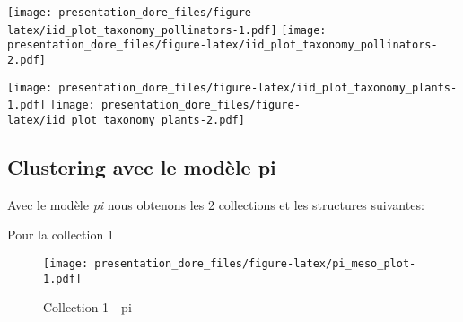\documentclass[
]{article}
\begin{document}
\texttt{[image: presentation\_dore\_files/figure-latex/iid\_plot\_taxonomy\_pollinators-1.pdf]}
\texttt{[image: presentation\_dore\_files/figure-latex/iid\_plot\_taxonomy\_pollinators-2.pdf]}

\texttt{[image: presentation\_dore\_files/figure-latex/iid\_plot\_taxonomy\_plants-1.pdf]}
\texttt{[image: presentation\_dore\_files/figure-latex/iid\_plot\_taxonomy\_plants-2.pdf]}

\hypertarget{clustering-avec-le-moduxe8le-pi}{%
\subsection{Clustering avec le modèle
pi}\label{clustering-avec-le-moduxe8le-pi}}

Avec le modèle \emph{pi} nous obtenons les 2 collections et les
structures suivantes:

Pour la collection 1

\begin{figure}
\centering
\texttt{[image: presentation\_dore\_files/figure-latex/pi\_meso\_plot-1.pdf]}
\caption{Collection 1 - pi}
\end{figure}
\end{document}

